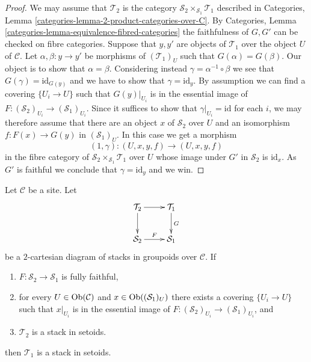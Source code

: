 \begin{proof}
We may assume that $\mathcal{T}_2$ is the category
$\mathcal{S}_2 \times_{\mathcal{S}_1} \mathcal{T}_1$
described in
Categories, Lemma \ref{categories-lemma-2-product-categories-over-C}.
By
Categories, Lemma \ref{categories-lemma-equivalence-fibred-categories}
the faithfulness of $G, G'$ can be checked on fibre categories.
Suppose that $y, y'$ are objects of $\mathcal{T}_1$ over the object $U$
of $\mathcal{C}$. Let $\alpha, \beta : y \to y'$ be morphisms of
$(\mathcal{T}_1)_U$ such that $G(\alpha) = G(\beta)$. Our object is to
show that $\alpha = \beta$. Considering instead
$\gamma = \alpha^{-1} \circ \beta$ we see that $G(\gamma) = \text{id}_{G(y)}$
and we have to show that $\gamma = \text{id}_y$. By assumption we
can find a covering $\{U_i \to U\}$ such that $G(y)|_{U_i}$ is in the
essential image of $F :(\mathcal{S}_2)_{U_i} \to (\mathcal{S}_1)_{U_i}$.
Since it suffices to show that $\gamma|_{U_i} = \text{id}$ for each $i$,
we may therefore assume that there are an object $x$ of $\mathcal{S}_2$
over $U$ and an isomorphism $f : F(x) \to G(y)$ in
$(\mathcal{S}_1)_U$. In this case we get
a morphism
$$
(1, \gamma) : (U, x, y, f) \longrightarrow (U, x, y, f)
$$
in the fibre category of $\mathcal{S}_2 \times_{\mathcal{S}_1} \mathcal{T}_1$
over $U$ whose image under $G'$ in $\mathcal{S}_2$ is $\text{id}_x$.
As $G'$ is faithful we conclude that $\gamma = \text{id}_y$ and we win.
\end{proof}

\begin{lemma}
\label{lemma-stack-in-setoids-descent}
Let $\mathcal{C}$ be a site.
Let
$$
\xymatrix{
\mathcal{T}_2 \ar[r] \ar[d] & \mathcal{T}_1 \ar[d]^G \\
\mathcal{S}_2 \ar[r]^F & \mathcal{S}_1
}
$$
be a $2$-cartesian diagram of stacks in groupoids over $\mathcal{C}$.
If
\begin{enumerate}
\item $F : \mathcal{S}_2 \to \mathcal{S}_1$ is fully faithful,
\item for every $U \in \mathop{\mathrm{Ob}}\nolimits(\mathcal{C})$ and
$x \in \mathop{\mathrm{Ob}}\nolimits((\mathcal{S}_1)_U)$ there exists a covering
$\{U_i \to U\}$ such that $x|_{U_i}$ is in the essential
image of $F : (\mathcal{S}_2)_{U_i} \to (\mathcal{S}_1)_{U_i}$, and
\item $\mathcal{T}_2$ is a stack in setoids.
\end{enumerate}
then $\mathcal{T}_1$ is a stack in setoids.
\end{lemma}


